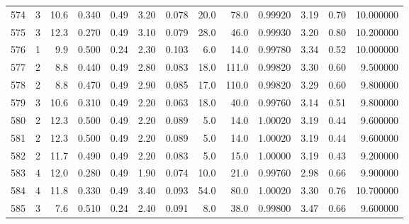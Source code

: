 \begin{tabular}{lrrrrrrrrrrrr}
574  &        3 &           10.6 &             0.340 &         0.49 &            3.20 &      0.078 &                 20.0 &                  78.0 &  0.99920 &  3.19 &       0.70 &  10.000000 \\
575  &        3 &           12.3 &             0.270 &         0.49 &            3.10 &      0.079 &                 28.0 &                  46.0 &  0.99930 &  3.20 &       0.80 &  10.200000 \\
576  &        1 &            9.9 &             0.500 &         0.24 &            2.30 &      0.103 &                  6.0 &                  14.0 &  0.99780 &  3.34 &       0.52 &  10.000000 \\
577  &        2 &            8.8 &             0.440 &         0.49 &            2.80 &      0.083 &                 18.0 &                 111.0 &  0.99820 &  3.30 &       0.60 &   9.500000 \\
578  &        2 &            8.8 &             0.470 &         0.49 &            2.90 &      0.085 &                 17.0 &                 110.0 &  0.99820 &  3.29 &       0.60 &   9.800000 \\
579  &        3 &           10.6 &             0.310 &         0.49 &            2.20 &      0.063 &                 18.0 &                  40.0 &  0.99760 &  3.14 &       0.51 &   9.800000 \\
580  &        2 &           12.3 &             0.500 &         0.49 &            2.20 &      0.089 &                  5.0 &                  14.0 &  1.00020 &  3.19 &       0.44 &   9.600000 \\
581  &        2 &           12.3 &             0.500 &         0.49 &            2.20 &      0.089 &                  5.0 &                  14.0 &  1.00020 &  3.19 &       0.44 &   9.600000 \\
582  &        2 &           11.7 &             0.490 &         0.49 &            2.20 &      0.083 &                  5.0 &                  15.0 &  1.00000 &  3.19 &       0.43 &   9.200000 \\
583  &        4 &           12.0 &             0.280 &         0.49 &            1.90 &      0.074 &                 10.0 &                  21.0 &  0.99760 &  2.98 &       0.66 &   9.900000 \\
584  &        4 &           11.8 &             0.330 &         0.49 &            3.40 &      0.093 &                 54.0 &                  80.0 &  1.00020 &  3.30 &       0.76 &  10.700000 \\
585  &        3 &            7.6 &             0.510 &         0.24 &            2.40 &      0.091 &                  8.0 &                  38.0 &  0.99800 &  3.47 &       0.66 &   9.600000 \\

\end{tabular}
